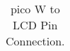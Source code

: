 \documentclass[12pt%
                    ]{report}
\begin{document}
\begin{table}
	\caption{pico W to LCD Pin Connection.}             %
\begin{tabular}[c]{%
	b{\gnumericColA}%
	b{\gnumericColB}%
	b{\gnumericColC}%
	b{\gnumericColD}%
	}







\end{tabular}
\end{table}
\end{document}
